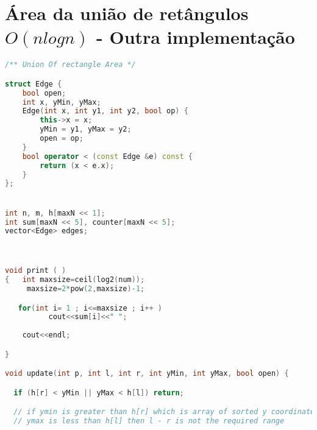 \documentclass[12pt,a4paper, twoside]{report}
\begin{document}
\section{Área da união de retângulos $O(n log n)$ - Outra implementação}
\noindent\begin{lstlisting}[caption=Área da união de retângulos (N log N) - Outra implementação,language=C++]
/** Union Of rectangle Area */ 

struct Edge {
    bool open;
    int x, yMin, yMax;
    Edge(int x, int y1, int y2, bool op) {
        this->x = x;
        yMin = y1, yMax = y2;
        open = op;
    }
    bool operator < (const Edge &e) const {
        return (x < e.x);
    }
};


int n, m, h[maxN << 1];
int sum[maxN << 5], counter[maxN << 5];
vector<Edge> edges;



void print ( )
{   int maxsize=ceil(log2(num));
     maxsize=2*pow(2,maxsize)-1;

   for(int i= 1 ; i<=maxsize ; i++ )
          cout<<sum[i]<<" ";
    
    cout<<endl;

}

void update(int p, int l, int r, int yMin, int yMax, bool open) {

  if (h[r] < yMin || yMax < h[l]) return;

  // if ymin is greater than h[r] which is array of sorted y coordinates or
  // ymax is less than h[l] then l - r is not the required range


\end{lstlisting}
\end{document}
